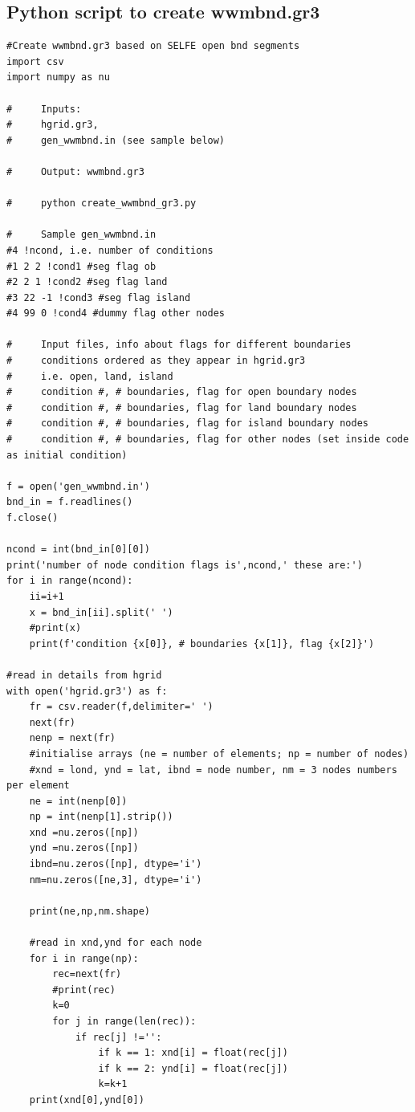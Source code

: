 \documentclass[preprints,briefreport,accept,oneauthor,pdftex]{Definitions/mdpi}
\begin{document}
\subsection{Python script to create wwmbnd.gr3}
\begin{verbatim}
#Create wwmbnd.gr3 based on SELFE open bnd segments
import csv
import numpy as nu

#     Inputs:         
#     hgrid.gr3, 
#     gen_wwmbnd.in (see sample below)

#     Output: wwmbnd.gr3

#     python create_wwmbnd_gr3.py
	
#     Sample gen_wwmbnd.in
#4 !ncond, i.e. number of conditions
#1 2 2 !cond1 #seg flag ob
#2 2 1 !cond2 #seg flag land
#3 22 -1 !cond3 #seg flag island
#4 99 0 !cond4 #dummy flag other nodes
	
#     Input files, info about flags for different boundaries
#     conditions ordered as they appear in hgrid.gr3
#     i.e. open, land, island
#     condition #, # boundaries, flag for open boundary nodes
#     condition #, # boundaries, flag for land boundary nodes
#     condition #, # boundaries, flag for island boundary nodes
#     condition #, # boundaries, flag for other nodes (set inside code as initial condition)

f = open('gen_wwmbnd.in')
bnd_in = f.readlines()
f.close()

ncond = int(bnd_in[0][0])
print('number of node condition flags is',ncond,' these are:')
for i in range(ncond):
    ii=i+1
    x = bnd_in[ii].split(' ')
    #print(x)
    print(f'condition {x[0]}, # boundaries {x[1]}, flag {x[2]}')

#read in details from hgrid
with open('hgrid.gr3') as f:
    fr = csv.reader(f,delimiter=' ')
    next(fr)
    nenp = next(fr)
    #initialise arrays (ne = number of elements; np = number of nodes)
    #xnd = lond, ynd = lat, ibnd = node number, nm = 3 nodes numbers per element 
    ne = int(nenp[0])
    np = int(nenp[1].strip())
    xnd =nu.zeros([np])
    ynd =nu.zeros([np])
    ibnd=nu.zeros([np], dtype='i')
    nm=nu.zeros([ne,3], dtype='i')

    print(ne,np,nm.shape)

    #read in xnd,ynd for each node
    for i in range(np):
        rec=next(fr)
        #print(rec)
        k=0
        for j in range(len(rec)):
            if rec[j] !='':
                if k == 1: xnd[i] = float(rec[j])
                if k == 2: ynd[i] = float(rec[j])
                k=k+1
    print(xnd[0],ynd[0])


\end{verbatim}
\end{document}
